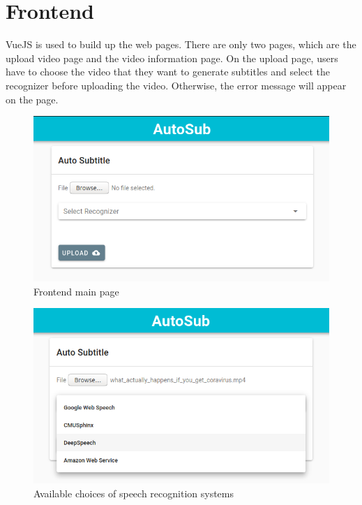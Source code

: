 \documentclass[natbib]{muthesis}
\begin{document}
 \section{Frontend}
 VueJS is used to build up the web pages. There are only two pages, which are the upload video page and the video information page.
 On the upload page, users have to choose the video that they want to generate subtitles and select the recognizer before uploading the video. Otherwise, the error message will appear on the page.
 \begin{figure}[H]
	\centering
	\captionsetup{justification=centering}
	\includegraphics[width=0.8\linewidth]{images/main}
	\caption{Frontend main page}
	\label{fig:frontend-main}
 \end{figure}

\begin{figure}[H]
\centering
\captionsetup{justification=centering}
\includegraphics[width=0.8\linewidth]{images/main-with-options}
\caption{Available choices of speech recognition systems}
\label{fig:frontend-main-with-options}
\end{figure}
 
\end{document}
